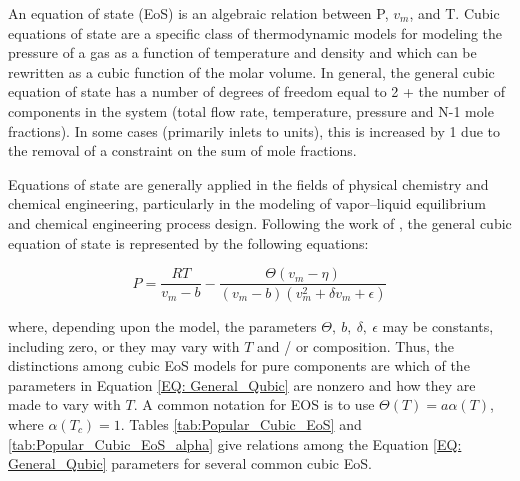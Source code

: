 \documentclass[../Article_Model_Parameters.tex]{subfiles}
\begin{document}
	
	
	
	An equation of state (EoS) is an algebraic relation between P, $v_m$, and T. Cubic equations of state are a specific class of thermodynamic models for modeling the pressure of a gas as a function of temperature and density and which can be rewritten as a cubic function of the molar volume. In general, the general cubic equation of state has a number of degrees of freedom equal to 2 + the number of components in the system (total flow rate, temperature, pressure and N-1 mole fractions). In some cases (primarily inlets to units), this is increased by 1 due to the removal of a constraint on the sum of mole fractions.
	
	Equations of state are generally applied in the fields of physical chemistry and chemical engineering, particularly in the modeling of vapor–liquid equilibrium and chemical engineering process design. Following the work of \citet{Poling2001}, the general cubic equation of state is represented by the following equations:
	
	{\footnotesize
	\begin{equation} \label{EQ: General_Qubic}
		P = \frac{RT}{v_m-b} - \frac{\Theta \left( v_m - \eta \right)}{\left( v_m - b \right) \left(v_m^2 + \delta v_m + \epsilon \right) }
	\end{equation}
	}
	
	where, depending upon the model, the parameters $\Theta,~b,~\delta,~\epsilon$ may be constants, including zero, or they may vary with $T$ and / or composition. Thus, the distinctions among cubic EoS models for pure components are which of the parameters in Equation \ref{EQ: General_Qubic} are nonzero and how they are made to vary with $T$. A common notation for EOS is to use $\Theta(T)=a\alpha(T)$, where $\alpha(T_c) = 1$. Tables \ref{tab:Popular_Cubic_EoS} and \ref{tab:Popular_Cubic_EoS_alpha} give relations among the Equation \ref{EQ: General_Qubic} parameters for several common cubic EoS.
	
	\begin{table}[h!]
		\centering
		\caption{Parameters for Popular Cubic EoS}
		\label{tab:Popular_Cubic_EoS}
	\end{table}
	
\end{document}
